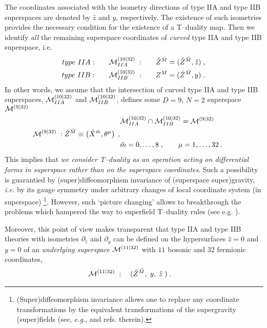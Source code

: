 \documentclass[a4paper,11pt]{article}
\begin{document}
The coordinates associated with the isometry directions 
of type IIA and type IIB superspaces are denoted by  
$\hat{z}$ and $y$, respectively. 
The existence of such isometries provides  the  necessary condition for 
the existence of a T--duality map. 
Then we identify {\sl all} 
the remaining superspace coordinates of {\sl curved}  
type IIA and type IIB superspace, i.e. 
  \begin{eqnarray}
\label{MIIA}
 type~IIA: & \qquad     {\cal M}_{IIA}^{(10|32)} \; : & \quad   
    \hat{Z}^{ {\hat{M}}} = 
 (\tilde{{Z}}{}^{ {\tilde{M}}}, \hat{z})\; ,
\\ \label{MIIB} 
  type~IIB: & \qquad   {\cal M}_{IIB}^{(10|32)} \; :  & \quad   
{Z}^{ {{M}}}= 
 (\tilde{Z}^{\tilde{M}}, y )\; . 
\end{eqnarray}
In other words, we assume that the intersection of curved type IIA and 
type IIB superspaces, ${\cal M}_{IIA}^{(10|32)}$ and 
${\cal M}_{IIB}^{(10|32)}$, defines some $D=9$, $N=2$ superspace 
${\cal M}^{(9|32)}$ 
\begin{eqnarray} 
\label{M9}
& {\cal M}_{IIA}^{(10|32)} \cap  {\cal M}_{IIB}^{(10|32)} = 
 {\cal M}^{(9|32)} \;  \\\   
\label{ZM9} {\cal M}^{(9|32)} \; : 
\tilde{Z}^{ \tilde{M}}
      \equiv \left(
          \tilde{X}^{\tilde{m}}, 
       {\theta}^{\mu}\right) \; , 
\\ 
\nonumber &
 {\tilde{m}}= 0, \ldots , 8 \; , \qquad 
 {{\mu}}= 1, \ldots , 32 \; . \qquad 
\end{eqnarray}
This implies that {\sl we 
consider  T--duality as an operation acting on differential 
forms in superspace rather than on the superspace coordinates}. 
Such a possibility is guarantied by (super)diffeomorphism invariance 
of (superspace super)gravity, {\it i.e.} by 
its  gauge symmetry under arbitrary 
changes of local coordinate system (in superspace)  
\footnote{(Super)diffeomorphism invariance 
 allows one to replace any coordinate transformations by the equivalent  
transformations  of the supergravity (super)fields (see, {\it e.g.},  
\cite{BdAI} and refs. therein).}. However, such 
`picture changing' allows 
to breakthrough the problems which hampered the way to superfield 
T--duality rules (see e.g. \cite{simon2}). 

Moreover, this point of view 
makes transparent that type IIA and type IIB  theories 
with isometries $\partial_{\hat{z}}$ and $\partial_{y}$
can be defined 
on the hypersurfaces $\hat{z}=0$ and $y=0$ of an {\it underlying superspace} 
${\cal M}^{(11|32)}$ with $11$ bosonic and $32$ fermionic coordinates,  
\begin{eqnarray}
\label{M11}
  & {\cal M}^{(11|32)} \; : \quad   
   (\tilde{{Z}}{}^{ {\tilde{M}}}, \; y, \; \hat{z}\;) \; .
\end{eqnarray}
\end{document}
